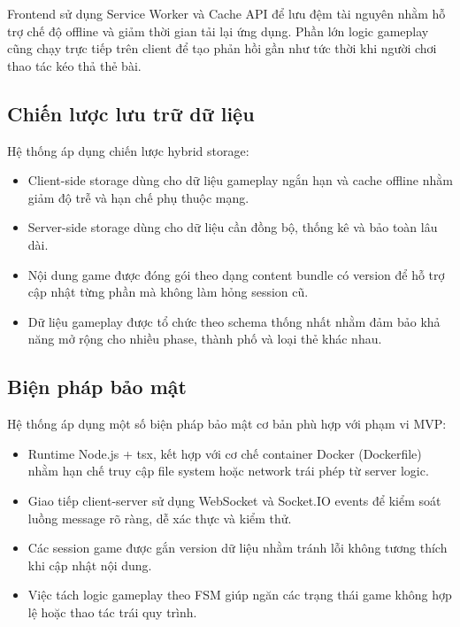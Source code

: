 Frontend sử dụng Service Worker và Cache API để lưu đệm tài nguyên nhằm hỗ trợ chế độ offline và giảm thời gian tải lại ứng dụng. Phần lớn logic gameplay cũng chạy trực tiếp trên client để tạo phản hồi gần như tức thời khi người chơi thao tác kéo thả thẻ bài.

\subsection{Chiến lược lưu trữ dữ liệu}

Hệ thống áp dụng chiến lược hybrid storage:

\begin{itemize}[topsep=0pt, itemsep=2pt, leftmargin=1.2cm]
    \item Client-side storage dùng cho dữ liệu gameplay ngắn hạn và cache offline nhằm giảm độ trễ và hạn chế phụ thuộc mạng.
    \item Server-side storage dùng cho dữ liệu cần đồng bộ, thống kê và bảo toàn lâu dài.
    \item Nội dung game được đóng gói theo dạng content bundle có version để hỗ trợ cập nhật từng phần mà không làm hỏng session cũ.
    \item Dữ liệu gameplay được tổ chức theo schema thống nhất nhằm đảm bảo khả năng mở rộng cho nhiều phase, thành phố và loại thẻ khác nhau.
\end{itemize}

\subsection{Biện pháp bảo mật}

Hệ thống áp dụng một số biện pháp bảo mật cơ bản phù hợp với phạm vi MVP:

\begin{itemize}[topsep=0pt, itemsep=2pt, leftmargin=1.2cm]
    \item Runtime Node.js + tsx, kết hợp với cơ chế container Docker (Dockerfile) nhằm hạn chế truy cập file system hoặc network trái phép từ server logic.
    \item Giao tiếp client-server sử dụng WebSocket và Socket.IO events để kiểm soát luồng message rõ ràng, dễ xác thực và kiểm thử.
    \item Các session game được gắn version dữ liệu nhằm tránh lỗi không tương thích khi cập nhật nội dung.
    \item Việc tách logic gameplay theo FSM giúp ngăn các trạng thái game không hợp lệ hoặc thao tác trái quy trình.
\end{itemize}
